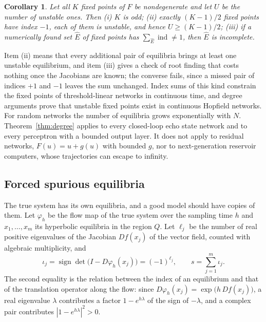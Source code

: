 \documentclass[aip,cha,reprint,amsmath,amssymb,longbibliography]{revtex4-2}
\newtheorem{corollary}{Corollary}
\theoremstyle{definition}
\newcommand{\ind}{\operatorname{ind}}
\begin{document}
\begin{corollary}
\label{cor:counts}
Let all $K$ fixed points of $F$ be nondegenerate and let $U$ be the number of unstable ones. Then
(i) $K$ is odd;
(ii) exactly $(K-1)/2$ fixed points have index $-1$, each of them is unstable, and hence $U\ge(K-1)/2$;
(iii) if a numerically found set $\hat E$ of fixed points has $\sum_{\hat E}\ind\neq1$, then $\hat E$ is incomplete.
\end{corollary}

Item (ii) means that every additional pair of equilibria brings at least one unstable equilibrium, and item (iii) gives a
check of root finding that costs nothing once the Jacobians are known; the converse fails, since a missed pair of indices
$+1$ and $-1$ leaves the sum unchanged. Index sums of this kind constrain the fixed points of threshold-linear networks in
continuous time,\cite{Curto2019TLN,Morrison2024TLN} and degree arguments prove that unstable fixed points exist in
continuous Hopfield networks.\cite{Beise2026UnstableHopfield} For random networks the number of equilibria grows
exponentially with $N$.\cite{WainribTouboul2013,BenArous2021Counting} Theorem~\ref{thm:degree} applies to every closed-loop
echo state network and to every perceptron with a bounded output layer. It does not apply to residual networks,
$F(u)=u+g(u)$ with bounded $g$, nor to next-generation reservoir computers, whose trajectories can escape to infinity.

\subsection{Forced spurious equilibria}
\label{sec:forced}

The true system has its own equilibria, and a good model should have copies of them. Let $\varphi_h$ be the flow map of
the true system over the sampling time $h$ and $x_1,\dots,x_m$ its hyperbolic equilibria in the region $Q$. Let $\ell_j$ be
the number of real positive eigenvalues of the Jacobian $Df(x_j)$ of the vector field, counted with algebraic multiplicity,
and
\begin{equation}
\iota_j=\operatorname{sign}\det\bigl(I-D\varphi_h(x_j)\bigr)=(-1)^{\ell_j},\qquad s=\sum_{j=1}^m\iota_j.
\label{eq:trueindex}
\end{equation}
The second equality is the relation between the index of an equilibrium and that of the translation operator along the
flow:\cite{KrasnoselskiiTranslation1968} since $D\varphi_h(x_j)=\exp\bigl(h\,Df(x_j)\bigr)$, a real eigenvalue $\lambda$
contributes a factor $1-e^{h\lambda}$ of the sign of $-\lambda$, and a complex pair contributes $|1-e^{h\lambda}|^2>0$.
\end{document}
